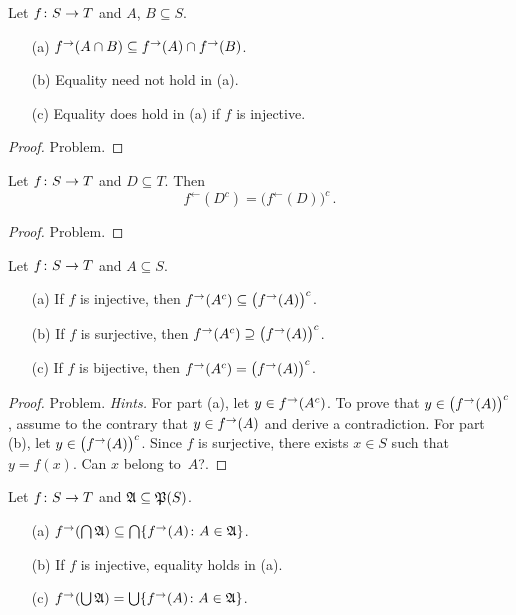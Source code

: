 \begin{prop}  Let $f\colon S \rightarrow T$ and $A$, $B \subseteq S$.
 \begin{enumerate}
   \item[(a)] $f^{\rightarrow}(A \cap B) \subseteq f^{\rightarrow}(A) \cap f^{\rightarrow}(B)$.
   \item[(b)] Equality need not hold in (a).
   \item[(c)] Equality does hold in (a) if $f$ is injective.
 \end{enumerate}
\end{prop}

\begin{proof} Problem.  \ns  \end{proof}

\begin{prop}\label{prop_finv_comp}  Let $f\colon S \rightarrow T$ and $D \subseteq T$. Then
   \[ f^\gets(D^c) = \bigl(f^\gets(D)\bigr)^c\,. \]
\end{prop}

\begin{proof} Problem.  \ns  \end{proof}

\begin{prop}\label{prop_f_comp}  Let $f\colon S \rightarrow T$ and $A \subseteq S$.
 \begin{enumerate}
   \item[(a)] If $f$ is injective, then $f^{\rightarrow}(A^c) \subseteq \bigl(f^{\rightarrow}(A)\bigr)^c$.
   \item[(b)] If $f$ is surjective, then $f^{\rightarrow}(A^c) \supseteq \bigl(f^{\rightarrow}(A)\bigr)^c$.
   \item[(c)] If $f$ is bijective, then $f^{\rightarrow}(A^c) = \bigl(f^{\rightarrow}(A)\bigr)^c$.
 \end{enumerate}
\end{prop}

\begin{proof} Problem.  \emph{Hints.}  For part (a), let $y \in f^{\rightarrow}(A^c)$. To prove that
$y \in \bigl(f^{\rightarrow}(A)\bigr)^c$, assume to the contrary that $y \in f^{\rightarrow}(A)$ and derive
a contradiction. For part (b), let $y \in \bigl(f^{\rightarrow}(A)\bigr)^c$. Since $f$ is surjective,
there exists $x \in S$ such that $y = f(x)$. Can $x$ belong to~$A$?.  \ns
\end{proof}

\begin{prop}\label{prop_f_fam}  Let $f\colon S \rightarrow T$ and $\mathfrak{A} \subseteq \mathfrak{P}(S)$.
 \begin{enumerate}
   \item[(a)] $f^{\rightarrow}(\bigcap\mathfrak{A}) \subseteq \bigcap\{f^{\rightarrow}(A) \colon A \in \mathfrak{A}\}$.
   \item[(b)] If $f$ is injective, equality holds in (a).
   \item[(c)] $f^{\rightarrow}(\bigcup\mathfrak{A}) = \bigcup\{f^{\rightarrow}(A) \colon A \in \mathfrak{A}\}$.
 \end{enumerate}
\end{prop}

